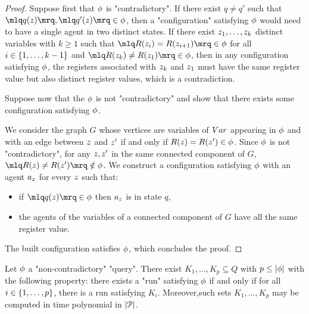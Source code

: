\ifproofs
\begin{proof}
	Suppose first that $\phi$ is "contradictory". If there exist $q \ne q'$ such that
	$\quotemarks{q(\varz)}, \quotemarks{q'(\varz)} \in \query$,  then a "configuration" satisfying $\phi$ would need to have a single agent in two distinct states. If there exist $\var{z_1}, \ldots, \var{z_k}$ distinct variables with $k\geq 1$ such that $\quotemarks{R(\varz_{i}) = R(\varz_{i+1})} \in \query$ for all $i \in \{1,\ldots,k-1\}$ and $\quotemarks{R(\varz_k) \neq R(\varz_1)} \in \query$, then in any configuration satisfying $\phi$,  the registers associated with $\varz_k$ and $\varz_1$ must have the same register value but also distinct register values, which is a contradiction. 
	
	Suppose now that the $\phi$ is not "contradictory" and show that there exists some configuration satisfying $\phi$.
	
	We consider the graph $G$ whose vertices are variables of $\varset$ appearing in $\phi$ and with an edge between $\varz$ and $\varz'$ if and only if $R(\varz) = R(\varz') \in \query$. Since $\phi$ is not "contradictory", for any $\varz, \varz'$ in the same connected component of $G$, $\quotemarks{R(\varz) \ne R(\varz')} \notin \query$. We construct a configuration satisfying $\phi$ with an agent $a_\varz$ for every $\varz$ such that:
	\begin{itemize}
		\item if $\quotemarks{q(\varz)} \in \query$ then $a_\varz$ is in state $q$,
		\item the agents of the variables of a connected component of $G$ have all the same register value.  
	\end{itemize}
	The built configuration satisfies $\phi$, which concludes the proof. 
\end{proof}
\fi

\begin{lemma}
	\label{lem:query-decomposition}
	Let $\phi$ a  "non-contradictory" "query". There exist $K_1, \ldots, K_p \subseteq Q$ with $p \leq |\phi|$ with the following property: there exists a "run" satisfying $\phi$ if and only if for all $i \in \{1,\ldots, p\}$, there is a run satisfying $K_i$. Moreover,such sets $K_1, \dots, K_p$ may be computed in time polynomial in $|\mathcal{P}|$. 
\end{lemma}


